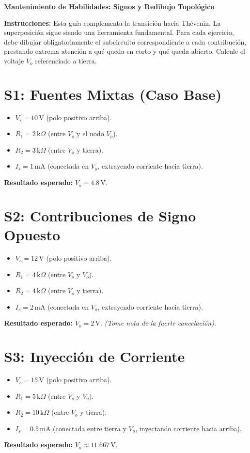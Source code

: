 \documentclass[11pt, a4paper]{article}
\begin{document}
\begin{tcolorbox}[colback=ucbblue!5!white, colframe=ucbblue, title=\textbf{Guía de Práctica de Casa: Superposición Continua}]
    \centering \textbf{Mantenimiento de Habilidades: Signos y Redibujo Topológico}
\end{tcolorbox}

\textbf{Instrucciones:} Esta guía complementa la transición hacia Thévenin. La superposición sigue siendo una herramienta fundamental. Para cada ejercicio, debe dibujar obligatoriamente el subcircuito correspondiente a cada contribución, prestando extrema atención a qué queda en corto y qué queda abierto. Calcule el voltaje $V_o$ referenciado a tierra.

\section*{S1: Fuentes Mixtas (Caso Base)}
\begin{itemize}
    \item $V_s=10\,\text{V}$ (polo positivo arriba).
    \item $R_1=2\,\text{k}\Omega$ (entre $V_s$ y el nodo $V_o$).
    \item $R_2=3\,\text{k}\Omega$ (entre $V_o$ y tierra).
    \item $I_s=1\,\text{mA}$ (conectada en $V_o$, extrayendo corriente hacia tierra).
\end{itemize}
\textbf{Resultado esperado:} $V_o = 4.8\,\text{V}$.

\section*{S2: Contribuciones de Signo Opuesto}
\begin{itemize}
    \item $V_s=12\,\text{V}$ (polo positivo arriba).
    \item $R_1=4\,\text{k}\Omega$ (entre $V_s$ y $V_o$).
    \item $R_2=4\,\text{k}\Omega$ (entre $V_o$ y tierra).
    \item $I_s=2\,\text{mA}$ (conectada en $V_o$, extrayendo corriente hacia tierra).
\end{itemize}
\textbf{Resultado esperado:} $V_o = 2\,\text{V}$. \textit{(Tome nota de la fuerte cancelación).}

\section*{S3: Inyección de Corriente}
\begin{itemize}
    \item $V_s=15\,\text{V}$ (polo positivo arriba).
    \item $R_1=5\,\text{k}\Omega$ (entre $V_s$ y $V_o$).
    \item $R_2=10\,\text{k}\Omega$ (entre $V_o$ y tierra).
    \item $I_s=0.5\,\text{mA}$ (conectada entre tierra y $V_o$, inyectando corriente hacia arriba).
\end{itemize}
\textbf{Resultado esperado:} $V_o \approx 11.667\,\text{V}$.
\end{document}
